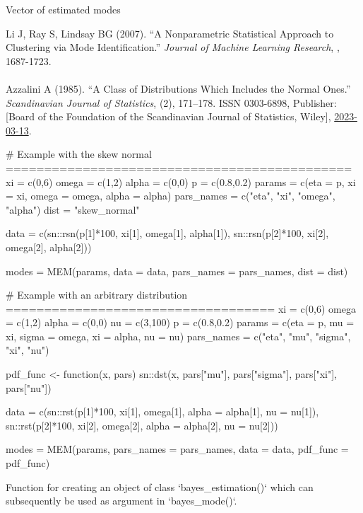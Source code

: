 \documentclass[a4paper]{book}
\begin{document}
%
\begin{Value}
Vector of estimated modes
\end{Value}
%
\begin{References}\relax
Li J, Ray S, Lindsay BG (2007).
``A Nonparametric Statistical Approach to Clustering via Mode Identiﬁcation.''
\emph{Journal of Machine Learning Research}, , 1687-1723.\\{}\\{}
Azzalini A (1985).
``A Class of Distributions Which Includes the Normal Ones.''
\emph{Scandinavian Journal of Statistics}, (2), 171--178.
ISSN 0303-6898, Publisher: [Board of the Foundation of the Scandinavian Journal of Statistics, Wiley], \url{2023-03-13}.
\end{References}
%
\begin{Examples}
\begin{ExampleCode}

# Example with the skew normal =============================================
xi = c(0,6)
omega = c(1,2)
alpha = c(0,0)
p = c(0.8,0.2)
params = c(eta = p, xi = xi, omega = omega, alpha = alpha)
pars_names = c("eta", "xi", "omega", "alpha")
dist = "skew_normal"

data = c(sn::rsn(p[1]*100, xi[1], omega[1], alpha[1]),
         sn::rsn(p[2]*100, xi[2], omega[2], alpha[2]))

modes = MEM(params, data = data, pars_names = pars_names, dist = dist)

# Example with an arbitrary distribution ===================================
xi = c(0,6)
omega = c(1,2)
alpha = c(0,0)
nu = c(3,100)
p = c(0.8,0.2)
params = c(eta = p, mu = xi, sigma = omega, xi = alpha, nu = nu)
pars_names = c("eta", "mu", "sigma", "xi", "nu")

pdf_func <- function(x, pars) {
  sn::dst(x, pars["mu"], pars["sigma"], pars["xi"], pars["nu"])
}

data = c(sn::rst(p[1]*100, xi[1], omega[1], alpha = alpha[1], nu = nu[1]),
         sn::rst(p[2]*100, xi[2], omega[2], alpha = alpha[2], nu = nu[2]))

modes = MEM(params, pars_names = pars_names, data = data, pdf_func = pdf_func)

\end{ExampleCode}
\end{Examples}
%
\begin{Description}\relax
Function for creating an object of class `bayes\_estimation()` which can subsequently be used as argument in `bayes\_mode()`.
\end{Description}
\end{document}
